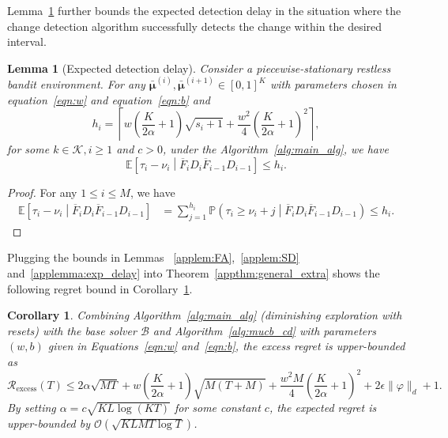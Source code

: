 \documentclass[twoside]{article}
\def\eqref#1{equation~\ref{#1}}
\def\Algref#1{Algorithm~\ref{#1}}
\def\gK{{\mathcal{K}}}
\newcommand{\E}{\mathbb{E}}
\theoremstyle{plain}
\newtheorem{lemma}[theorem]{Lemma}
\newtheorem{corollary}[theorem]{Corollary}
\theoremstyle{definition}
\theoremstyle{remark}
\def\Rex{\mathcal{R}_{\mathrm{excess}}}
\begin{document}

Lemma~\ref{applemma:gen_exp_delay} further bounds the expected detection delay in the situation where the change detection algorithm successfully detects the change within the desired interval.

\begin{lemma}[Expected detection delay]\label{applemma:gen_exp_delay} 
Consider a piecewise-stationary restless bandit environment. For any $\boldsymbol{\bar{\mu}}^{(i)},\boldsymbol{\bar{\mu}}^{(i+1)}\in\left[0,1\right]^{K}$ with parameters chosen in \eqref{eqn:w} and \eqref{eqn:b} 
and
\begin{equation}
h_{i} = \left\lceil w\left(\frac{K}{2\alpha}+1\right)\sqrt{s_{i}+1}+\frac{w^{2}}{4}\left(\frac{K}{2\alpha}+1\right)^{2} \right\rceil,
\end{equation}
for some $k\in\gK, i\geq 1$ and $c>0$, under the \Algref{alg:main_alg}, we have
\begin{equation}
    \E\left[\tau_{i}-\nu_{i}\middle| \overline{F}_{i}D_{i}\overline{F}_{i-1}D_{i-1}\right]\leq h_{i}.
\end{equation}
\end{lemma}


\begin{proof}
    For any $1\leq i\leq M$, we have
    \begin{subequations}
        \begin{align}
            \E\left[\tau_{i}-\nu_{i}\middle| \overline{F}_{i}D_{i}\overline{F}_{i-1}D_{i-1}\right]  
            &=\sum^{h_{i}}_{j=1}\mathbb{P}\left(\tau_{i}\geq\nu_{i}+j\middle| \overline{F}_{i}D_{i}\overline{F}_{i-1}D_{i-1}\right)
            \leq h_{i}.
        \end{align}
    \end{subequations}
\end{proof}

Plugging the bounds in Lemmas ~\ref{applem:FA},~\ref{applem:SD} and~\ref{applemma:exp_delay} into Theorem~\ref{appthm:general_extra} shows the following regret bound in Corollary~\ref{appcor:gen_mucb}.

\begin{corollary}\label{appcor:gen_mucb}
Combining Algorithm~\ref{alg:main_alg} (diminishing exploration with resets) 
with the base solver $\mathcal{B}$ and Algorithm~\ref{alg:mucb_cd} with parameters $(w,b)$ given in Equations~\ref{eqn:w} and~\ref{eqn:b}, 
the excess regret is upper-bounded as
\begin{equation}
     \Rex(T)\leq 2\alpha\sqrt{MT}+w\left(\frac{K}{2\alpha}+1\right)\sqrt{M\left(T+M\right)}+\frac{w^{2}M}{4}\left(\frac{K}{2\alpha}+1\right)^{2}+2\epsilon \lVert \varphi \rVert _{d}+1.
\end{equation}\label{eqn:regret_bound_MUCB_p}By setting $\alpha = c\sqrt{KL\log{\left(KT\right)}}$ for some constant $c$, the expected regret is upper-bounded by $\mathcal{O}(\sqrt{KLMT\log{T}})$.
\end{corollary}
\end{document}
